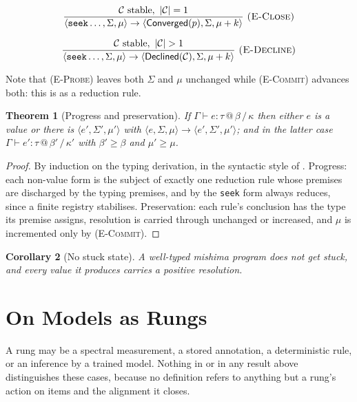 \documentclass[11pt,twocolumn,a4paper]{article}
\newtheorem{theorem}{Theorem}[section]
\newtheorem{corollary}[theorem]{Corollary}
\theoremstyle{definition}
\theoremstyle{remark}
\newcommand{\flo}{\beta}
\newcommand{\pot}{\kappa}
\newcommand{\rec}{\mu}
\newcommand{\Reached}{\mathcal{C}}
\begin{document}
\[
\frac{\Reached \text{ stable},\ |\Reached| = 1}
     {\langle \texttt{seek}\dots, \Sigma, \rec\rangle \to
      \langle \textsf{Converged}(p), \Sigma, \rec + k\rangle}
\ \textsc{(E-Close)}
\]

\[
\frac{\Reached \text{ stable},\ |\Reached| > 1}
     {\langle \texttt{seek}\dots, \Sigma, \rec\rangle \to
      \langle \textsf{Declined}(\Reached), \Sigma, \rec + k\rangle}
\ \textsc{(E-Decline)}
\]

Note that \textsc{(E-Probe)} leaves both $\Sigma$ and $\rec$ unchanged while
\textsc{(E-Commit)} advances both: this is  as a reduction rule.

\begin{theorem}[Progress and preservation]
\label{thm:soundness}
If $\Gamma\vdash e:\tau\,@\,\flo\,/\,\pot$ then either $e$ is a value or there is
$\langle e',\Sigma',\rec'\rangle$ with
$\langle e,\Sigma,\rec\rangle\to\langle e',\Sigma',\rec'\rangle$; and in the
latter case $\Gamma\vdash e':\tau\,@\,\flo'\,/\,\pot'$ with $\flo'\ge\flo$ and
$\rec'\ge\rec$.
\end{theorem}

\begin{proof}
By induction on the typing derivation, in the syntactic style of
\citet{wright1994syntactic}. Progress: each non-value form is the subject of
exactly one reduction rule whose premises are discharged by the typing premises,
and by  the \texttt{seek} form always reduces, since a finite
registry stabilises. Preservation: each rule's conclusion has the type its
premise assigns, resolution is carried through unchanged or increased, and
$\rec$ is incremented only by \textsc{(E-Commit)}.
\end{proof}

\begin{corollary}[No stuck state]
\label{cor:nostuck}
A well-typed mishima program does not get stuck, and every value it produces
carries a positive resolution.
\end{corollary}

\section{On Models as Rungs}
\label{sec:models}

A rung may be a spectral measurement, a stored annotation, a deterministic rule,
or an inference by a trained model. Nothing in  or in any result
above distinguishes these cases, because no definition refers to anything but a
rung's action on items and the alignment it closes.
\end{document}
